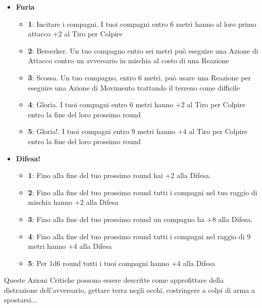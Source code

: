 \begin{multicols}{2}
\begin{itemize}[leftmargin=*]
	\item \textbf{Furia}
	\begin{itemize}[leftmargin=*]
		\setlength{\itemsep}{0pt}
		\item \textbf{1}: Incitare i compagni. I tuoi compagni entro 6 metri hanno al loro primo attacco +2 al Tiro per Colpire

		\item \textbf{2}: Berserker. Un tuo compagno entro sei metri può eseguire una Azione di Attacco contro un avversario in mischia al costo di una Reazione

		\item \textbf{3}: Scossa. Un tuo compagno, entro 6 metri, può usare una Reazione per eseguire una Azione di Movimento trattando il terreno come difficile

		\item \textbf{4}: Gloria. I tuoi compagni entro 6 metri hanno +2 al Tiro per Colpire entro la fine del loro prossimo round

		\item \textbf{5}: Gloria!. I tuoi compagni entro 9 metri hanno +4 al Tiro per Colpire entro la fine del loro prossimo round
	\end{itemize}

	\item \textbf{Difesa!}
	\begin{itemize}[leftmargin=*]
		\setlength{\itemsep}{0pt}
		\item \textbf{1}: Fino alla fine del tuo prossimo round hai +2 alla Difesa.

		\item \textbf{2}: Fino alla fine del tuo prossimo round tutti i compagni nel tuo raggio di mischia hanno +2 alla Difesa

		\item \textbf{3}: Fino alla fine del tuo prossimo round un compagno ha +8 alla Difesa.

		\item \textbf{4}: Fino alla fine del tuo prossimo round tutti i compagni nel raggio di 9 metri hanno +4 alla Difesa

		\item \textbf{5}: Per 1d6 round tutti i tuoi compagni hanno +4 alla Difesa
	\end{itemize}

\end{itemize}

\medskip

\begin{narratore}
Queste Azioni Critiche possono essere descritte come approfittare della distrazione dell'avversario, gettare terra negli occhi, costringere a colpi di arma a spostarsi...
\end{narratore}


\end{multicols}
